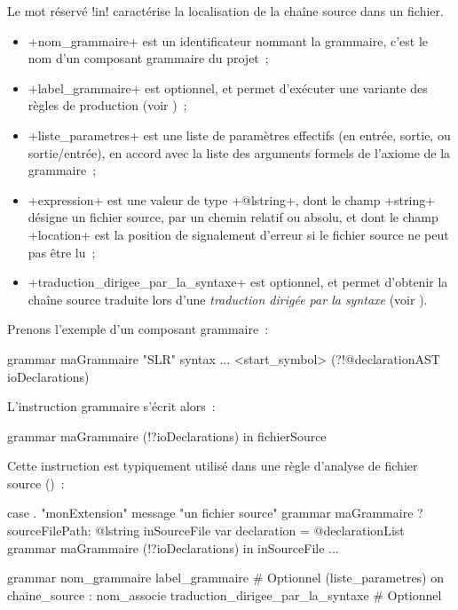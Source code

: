 Le mot réservé \ggsq!in! caractérise la localisation de la chaîne source dans un fichier.
\begin{itemize}
  \item \ggsq+nom_grammaire+ est un identificateur nommant la grammaire, c'est le nom d'un composant grammaire du projet~;
  \item \ggsq+label_grammaire+ est optionnel, et permet d'exécuter une variante des règles de production (voir )~;
  \item \ggsq+liste_parametres+ est une liste de paramètres effectifs (en entrée, sortie, ou sortie/entrée), en accord avec la liste des arguments formels de l'axiome de la grammaire~;
  \item \ggsq+expression+ est une valeur de type \ggsq+@lstring+, dont le champ \ggsq+string+ désigne un fichier source, par un chemin relatif ou absolu, et dont le champ \ggsq+location+ est la position de signalement d'erreur si le fichier source ne peut pas être lu~;
  \item \ggsq+traduction_dirigee_par_la_syntaxe+ est optionnel, et permet d'obtenir la chaîne source traduite lors d'une \emph{traduction dirigée par la syntaxe} (voir ).
\end{itemize}

Prenons l'exemple d'un composant grammaire~:
\begin{galgas4}
grammar maGrammaire "SLR" {
  syntax ...
   <start_symbol> (?!@declarationAST ioDeclarations)
}
\end{galgas4}

L'instruction grammaire s'écrit alors~:
\begin{galgas4}
grammar maGrammaire (!?ioDeclarations) in fichierSource
\end{galgas4}

Cette instruction est typiquement utilisé dans une règle d'analyse de fichier source ()~:

\begin{galgas4}
case . "monExtension"
message "un fichier source"
grammar maGrammaire
?sourceFilePath: @lstring inSourceFile {
  var declaration = @declarationList {}
  grammar maGrammaire (!?ioDeclarations) in inSourceFile
  ...
}
\end{galgas4}




\begin{galgas4box}
grammar
  nom_grammaire
  label_grammaire # Optionnel
  (liste_parametres)
  on chaine_source : nom_associe
  traduction_dirigee_par_la_syntaxe # Optionnel
\end{galgas4box}

